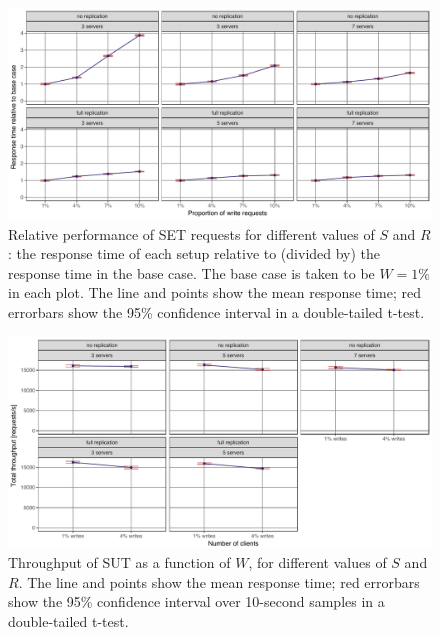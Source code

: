 \documentclass[11pt]{article}
\begin{document}
\begin{figure}[h]
\centering
\includegraphics[width=\textwidth]{../results/writes/graphs/relative_performance_set.pdf}
\caption{Relative performance of SET requests for different values of $S$ and $R$: the response time of each setup relative to (divided by) the response time in the base case. The base case is taken to be $W=1\%$ in each plot.
The line and points show the mean response time; red errorbars show the 95\% confidence interval in a double-tailed t-test.}
\label{fig:exp3:res:relative:set}
\end{figure}

\begin{figure}[h]
\centering
\includegraphics[width=\textwidth]{../results/writes/graphs/throughput_vs_writes.pdf}
\caption{Throughput of SUT as a function of $W$, for different values of $S$ and $R$. The line and points show the mean response time; red errorbars show the 95\% confidence interval over 10-second samples in a double-tailed t-test.}
\label{fig:exp3:res:throughput}
\end{figure}
\end{document}
